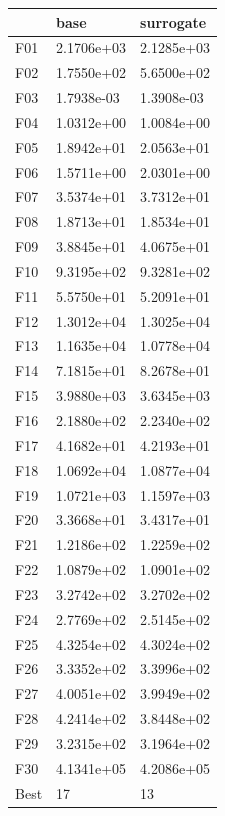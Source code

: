 \begin{tabular}{lll}
\toprule
{} &        base &   surrogate \\
\midrule
F01  &  2.1706e+03 &  2.1285e+03 \\
F02  &  1.7550e+02 &  5.6500e+02 \\
F03  &  1.7938e-03 &  1.3908e-03 \\
F04  &  1.0312e+00 &  1.0084e+00 \\
F05  &  1.8942e+01 &  2.0563e+01 \\
F06  &  1.5711e+00 &  2.0301e+00 \\
F07  &  3.5374e+01 &  3.7312e+01 \\
F08  &  1.8713e+01 &  1.8534e+01 \\
F09  &  3.8845e+01 &  4.0675e+01 \\
F10  &  9.3195e+02 &  9.3281e+02 \\
F11  &  5.5750e+01 &  5.2091e+01 \\
F12  &  1.3012e+04 &  1.3025e+04 \\
F13  &  1.1635e+04 &  1.0778e+04 \\
F14  &  7.1815e+01 &  8.2678e+01 \\
F15  &  3.9880e+03 &  3.6345e+03 \\
F16  &  2.1880e+02 &  2.2340e+02 \\
F17  &  4.1682e+01 &  4.2193e+01 \\
F18  &  1.0692e+04 &  1.0877e+04 \\
F19  &  1.0721e+03 &  1.1597e+03 \\
F20  &  3.3668e+01 &  3.4317e+01 \\
F21  &  1.2186e+02 &  1.2259e+02 \\
F22  &  1.0879e+02 &  1.0901e+02 \\
F23  &  3.2742e+02 &  3.2702e+02 \\
F24  &  2.7769e+02 &  2.5145e+02 \\
F25  &  4.3254e+02 &  4.3024e+02 \\
F26  &  3.3352e+02 &  3.3996e+02 \\
F27  &  4.0051e+02 &  3.9949e+02 \\
F28  &  4.2414e+02 &  3.8448e+02 \\
F29  &  3.2315e+02 &  3.1964e+02 \\
F30  &  4.1341e+05 &  4.2086e+05 \\
Best &          17 &          13 \\
\bottomrule
\end{tabular}

